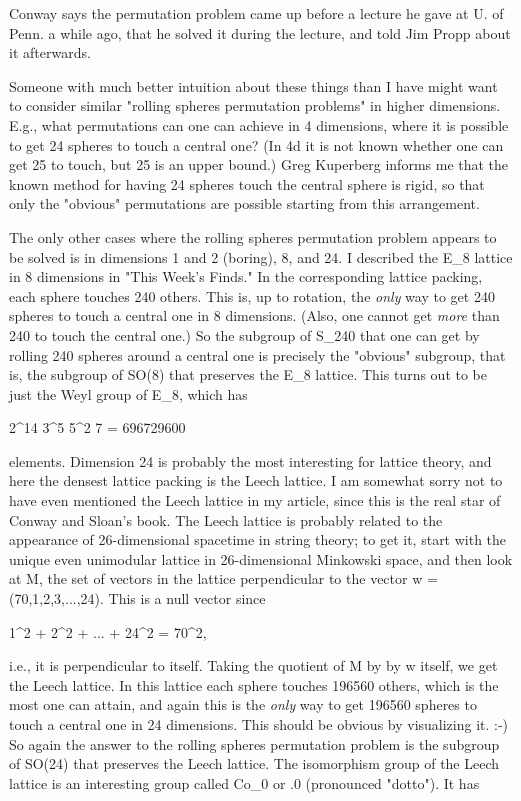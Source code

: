 Conway says the permutation problem came up before a lecture he gave at 
U. of Penn. a while ago, that he solved it during the lecture, and told 
Jim Propp about it afterwards.

Someone with much better intuition about these things than I have might
want to consider similar "rolling spheres permutation problems"
in higher dimensions.  E.g., what permutations can one can achieve 
in 4 dimensions, where it is possible to get 24 spheres to touch a central 
one?  (In 4d it is not known whether one can get 25 to touch, but 25
is an upper bound.)  Greg Kuperberg informs me that the known
method for having 24 spheres touch the central sphere is rigid, so that
only the "obvious" permutations are possible starting from 
this arrangement.

The only other cases where the rolling spheres permutation problem
appears to be solved is in dimensions 1 and 2 (boring), 8, and 24.  I
described the E_{8} lattice in 8 dimensions in "This Week's Finds."  In the 
corresponding lattice packing, each sphere touches 240 others.  This is, 
up to rotation, the \emph{only} way to get 240 spheres to touch a central 
one in 8 dimensions.  (Also, one cannot get \emph{more} than 240 to touch the central one.) 
So the subgroup of S_{240} that one can get by rolling 240 spheres 
around a central one is precisely the "obvious" subgroup, that is, the 
subgroup of SO(8) that preserves the E_{8} lattice.  This turns out 
to be just the Weyl group of E_{8}, which has

2^{14} 3^{5} 5^{2} 7 = 696729600

elements.
Dimension 24 is probably the most interesting for lattice theory, and here
the densest lattice packing is the Leech lattice.  I am somewhat sorry 
not to have even mentioned the Leech lattice in my article, since this is
the real star of Conway and Sloan's book.  The Leech lattice is probably 
related to the appearance of 26-dimensional spacetime in string theory; 
to get it, start with the unique even unimodular lattice in 26-dimensional 
Minkowski space, and then look at M, the set of vectors in the lattice 
perpendicular to the vector w = (70,1,2,3,...,24).  This is a null vector 
since
 
1^{2} + 2^{2} + ... + 24^{2} = 70^{2},
 
i.e., it is perpendicular to itself.  Taking the quotient of M by
by w itself, we get the Leech lattice.  In this lattice each sphere
touches 196560 others, which is the most one can attain, and again this
is the \emph{only} way to get 196560 spheres to touch a central one in 24
dimensions.  This should be obvious by visualizing it.  :-)  So again the
answer to the rolling spheres permutation problem is the subgroup of
SO(24) that preserves the Leech lattice.  The isomorphism group of the
Leech lattice is an interesting group called Co_{0} or .0 (pronounced
"dotto").   It has

